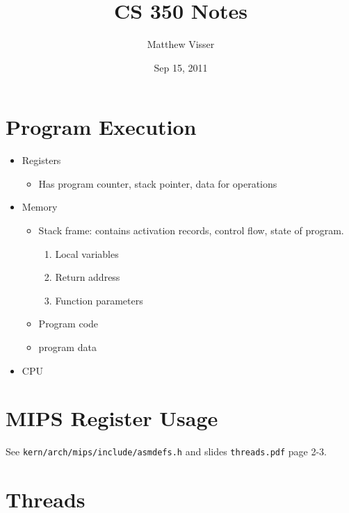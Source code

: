 \documentclass[12pt]{article}
\begin{document}
\title{CS 350 Notes}
\author{Matthew Visser}
\date{Sep 15, 2011}
\maketitle

\newcommand{\ie}{\textit{i.e.}}
\section{Program Execution}

\begin{itemize}
    \item Registers
        \begin{itemize}
            \item  Has program counter, stack pointer, data for operations
        \end{itemize}
    \item Memory
        \begin{itemize}
            \item Stack frame: contains activation records, control flow, state
                of program.
                \begin{enumerate}
                    \item Local variables
                    \item Return address
                    \item Function parameters
                \end{enumerate}
            \item Program code
            \item program data
        \end{itemize}
    \item CPU
\end{itemize}

\section{MIPS Register Usage}

See \texttt{kern/arch/mips/include/asmdefs.h} and slides \texttt{threads.pdf}
page 2-3.

\section{Threads}
\end{document}
